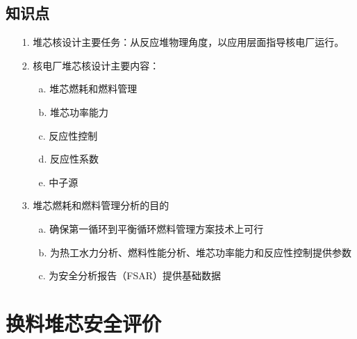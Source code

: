 \documentclass[openany]{ctexart}
\numberwithin{equation}{section} %
\begin{document}
\subsection{知识点}
\begin{itemize}
	\item [1.]堆芯核设计主要任务：从反应堆物理角度，以应用层面指导核电厂运行。
			\vspace{0.08cm}
	\item [2.]核电厂堆芯核设计主要内容：
	\begin{itemize}
		\vspace{-0.12cm}
		\item [a.]堆芯燃耗和燃料管理
		\vspace{-0.15cm}
		\item [b.]堆芯功率能力
		\vspace{-0.15cm}
		\item [c.]反应性控制
		\vspace{-0.15cm}
		\item [d.]反应性系数
		\vspace{-0.15cm}
		\item [e.]中子源
	\end{itemize}
	
	\item [3.]堆芯燃耗和燃料管理分析的目的
	\begin{itemize}
		\vspace{-0.1cm}
		\item [a.]确保第一循环到平衡循环燃料管理方案技术上可行
		\vspace{-0.15cm}
		\item [b.]为热工水力分析、燃料性能分析、堆芯功率能力和反应性控制提供参数
		\vspace{-0.15cm}
		\item [c.]为安全分析报告（FSAR）提供基础数据
	\end{itemize}
\end{itemize}


\newpage

\section{换料堆芯安全评价}
\end{document}
